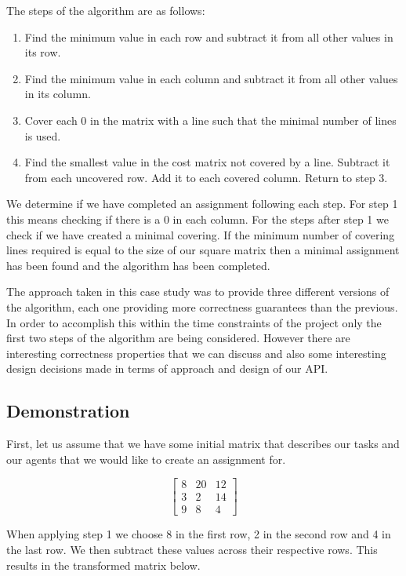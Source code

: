 \documentclass[a4paper, notitlepage]{report}
\begin{document}
The steps of the algorithm are as follows:
\begin{enumerate}
\item Find the minimum value in each row and subtract it from all other values in
its row.
\item Find the minimum value in each column and subtract it from all other values
in its column.
\item Cover each 0 in the matrix with a line such that the minimal number of lines
is used.
\item Find the smallest value in the cost matrix not covered by a line. Subtract it
from each uncovered row. Add it to each covered column. Return to step 3.
\end{enumerate}

We determine if we have completed an assignment following each step. For step 1
this means checking if there is a 0 in each column. For the steps after step 1
we check if we have created a minimal covering. If the minimum number of
covering lines required is equal to the size of our square matrix then a minimal
assignment has been found and the algorithm has been completed.

The approach taken in this case study was to provide three different versions of
the algorithm, each one providing more correctness guarantees than the previous.
In order to accomplish this within the time constraints of the project only the
first two steps of the algorithm are being considered. However there are
interesting correctness properties that we can discuss and also some interesting
design decisions made in terms of approach and design of our API.

\subsection{Demonstration}
\label{sec:orgf90983d}
First, let us assume that we have some initial matrix that describes our tasks
and our agents that we would like to create an assignment for.

\[ \begin{bmatrix}
8 & 20 & 12 \\
3 & 2 & 14 \\
9 & 8 & 4
\end{bmatrix} \]

When applying step 1 we choose 8 in the first row, 2 in the second row and 4 in
the last row. We then subtract these values across their respective rows. This
results in the transformed matrix below.
\end{document}
